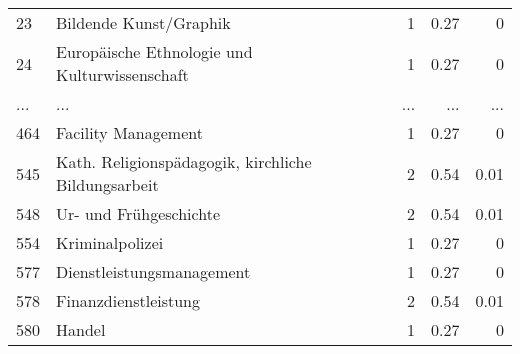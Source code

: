 \begin{longtable}{lXrrr}
        23 & \multicolumn{1}{X}{Bildende Kunst/Graphik} & %
          \num{1} &
          \num[round-mode=places,round-precision=2]{0,27} &
          \num[round-mode=places,round-precision=2]{0} \\
        24 & \multicolumn{1}{X}{Europäische Ethnologie und Kulturwissenschaft} & %
          \num{1} &
          \num[round-mode=places,round-precision=2]{0,27} &
          \num[round-mode=places,round-precision=2]{0} \\
       ... & ... & ... & ... & ... \\
        464 & \multicolumn{1}{X}{Facility Management} & %
          \num{1} &
          \num[round-mode=places,round-precision=2]{0,27} &
          \num[round-mode=places,round-precision=2]{0} \\

        545 & \multicolumn{1}{X}{Kath. Religionspädagogik, kirchliche Bildungsarbeit} & %
          \num{2} &
          \num[round-mode=places,round-precision=2]{0,54} &
          \num[round-mode=places,round-precision=2]{0,01} \\

        548 & \multicolumn{1}{X}{Ur- und Frühgeschichte} & %
          \num{2} &
          \num[round-mode=places,round-precision=2]{0,54} &
          \num[round-mode=places,round-precision=2]{0,01} \\

        554 & \multicolumn{1}{X}{Kriminalpolizei} & %
          \num{1} &
          \num[round-mode=places,round-precision=2]{0,27} &
          \num[round-mode=places,round-precision=2]{0} \\

        577 & \multicolumn{1}{X}{Dienstleistungsmanagement} & %
          \num{1} &
          \num[round-mode=places,round-precision=2]{0,27} &
          \num[round-mode=places,round-precision=2]{0} \\

        578 & \multicolumn{1}{X}{Finanzdienstleistung} & %
          \num{2} &
          \num[round-mode=places,round-precision=2]{0,54} &
          \num[round-mode=places,round-precision=2]{0,01} \\

        580 & \multicolumn{1}{X}{Handel} & %
          \num{1} &
          \num[round-mode=places,round-precision=2]{0,27} &
          \num[round-mode=places,round-precision=2]{0} \\


\end{longtable}
